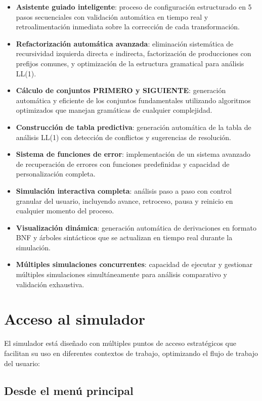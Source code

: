 \begin{itemize}
    \item \textbf{Asistente guiado inteligente}: proceso de configuración estructurado en 5 pasos secuenciales con validación automática en tiempo real y retroalimentación inmediata sobre la corrección de cada transformación.
    \item \textbf{Refactorización automática avanzada}: eliminación sistemática de recursividad izquierda directa e indirecta, factorización de producciones con prefijos comunes, y optimización de la estructura gramatical para análisis LL(1).
    \item \textbf{Cálculo de conjuntos PRIMERO y SIGUIENTE}: generación automática y eficiente de los conjuntos fundamentales utilizando algoritmos optimizados que manejan gramáticas de cualquier complejidad.
    \item \textbf{Construcción de tabla predictiva}: generación automática de la tabla de análisis LL(1) con detección de conflictos y sugerencias de resolución.
    \item \textbf{Sistema de funciones de error}: implementación de un sistema avanzado de recuperación de errores con funciones predefinidas y capacidad de personalización completa.
    \item \textbf{Simulación interactiva completa}: análisis paso a paso con control granular del usuario, incluyendo avance, retroceso, pausa y reinicio en cualquier momento del proceso.
    \item \textbf{Visualización dinámica}: generación automática de derivaciones en formato BNF y árboles sintácticos que se actualizan en tiempo real durante la simulación.
    \item \textbf{Múltiples simulaciones concurrentes}: capacidad de ejecutar y gestionar múltiples simulaciones simultáneamente para análisis comparativo y validación exhaustiva.
\end{itemize}

\section{Acceso al simulador}

El simulador está diseñado con múltiples puntos de acceso estratégicos que facilitan su uso en diferentes contextos de trabajo, optimizando el flujo de trabajo del usuario:

\subsection{Desde el menú principal}

